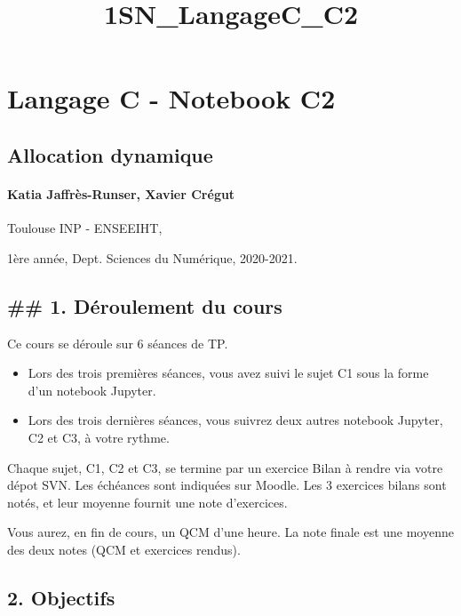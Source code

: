\documentclass[11pt]{article}
\title{1SN\_LangageC\_C2}
\providecommand{\tightlist}{%
      \setlength{\itemsep}{0pt}\setlength{\parskip}{0pt}}
\begin{document}
    
    
    \maketitle
    
    

    
    \section{Langage C - Notebook C2}\label{langage-c---notebook-c2}

\subsection{Allocation dynamique}\label{allocation-dynamique}

\paragraph{Katia Jaffrès-Runser, Xavier
Crégut}\label{katia-jaffruxe8s-runser-xavier-cruxe9gut}

Toulouse INP - ENSEEIHT,

1ère année, Dept. Sciences du Numérique, 2020-2021.

    \subsection{\#\# 1. Déroulement du cours}\label{duxe9roulement-du-cours}

Ce cours se déroule sur 6 séances de TP.

\begin{itemize}
\tightlist
\item
  Lors des trois premières séances, vous avez suivi le sujet C1 sous la
  forme d'un notebook Jupyter.
\item
  Lors des trois dernières séances, vous suivrez deux autres notebook
  Jupyter, C2 et C3, à votre rythme.
\end{itemize}

Chaque sujet, C1, C2 et C3, se termine par un exercice Bilan à rendre
via votre dépot SVN. Les échéances sont indiquées sur Moodle. Les 3
exercices bilans sont notés, et leur moyenne fournit une note
d'exercices.

Vous aurez, en fin de cours, un QCM d'une heure. La note finale est une
moyenne des deux notes (QCM et exercices rendus).

    \subsection{2. Objectifs}\label{objectifs}
\end{document}
